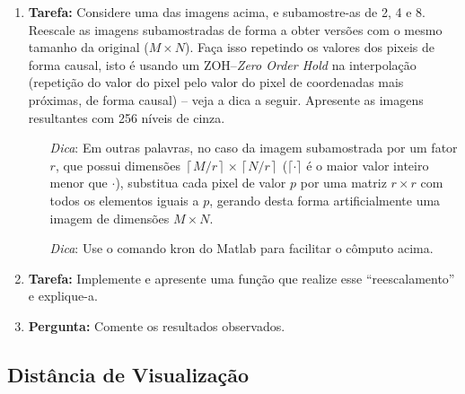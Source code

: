\documentclass[11pt]{article}
\begin{document}
\begin{enumerate}

\item \textbf{Tarefa:} Considere uma das imagens acima, e subamostre-as de 2, 4 e 8. Reescale as imagens subamostradas de forma a obter versões com o mesmo tamanho da original ($M \times N$). Faça isso repetindo os valores dos pixeis de forma causal, isto é usando um ZOH--\emph{Zero Order Hold} na interpolação (repetição do valor do pixel pelo valor do pixel de coordenadas mais próximas, de forma causal) -- veja a dica a seguir. Apresente as imagens resultantes com 256 níveis de cinza.

\begin{itemize} 
\item [\textit{Dica}:] Em outras palavras, no caso da imagem subamostrada por um fator $r$, que possui dimensões $\left \lceil M/r \right \rceil \times \left \lceil N/r \right \rceil$ ($\lceil \cdot \rceil$ é o maior valor inteiro menor que $\cdot$), substitua cada pixel de valor $p$ por uma matriz $r\times r$ com todos os elementos iguais a $p$, gerando desta forma artificialmente uma imagem de dimensões $M \times N$. 
\item [\textit{Dica}:] Use o comando \textsf{kron} do \textsf{Matlab} para facilitar o cômputo acima.
\end{itemize}

\item \textbf{Tarefa:} Implemente e apresente uma função que realize esse ``reescalamento'' e explique-a.

\item \textbf{Pergunta:} Comente os resultados observados. 

\end{enumerate}

\subsection{Distância de Visualização}
\end{document}
